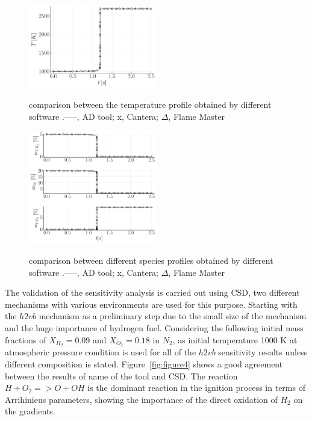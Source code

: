\documentclass[preprint,review,12pt]{elsarticle}
\begin{document}
      \begin{figure}
\centering
 {\includegraphics[width=0.5\textwidth]{figures/T validation.pdf}}
\caption{comparison between the temperature profile obtained by different software .-----, AD tool; x, Cantera; $\Delta$, Flame Master  }
    \label{fig:figure2}
 \end{figure}   
 \begin{figure}
\centering
 {\includegraphics[width=0.5\textwidth]{figures/all validation.pdf}}
\caption{comparison between different species profiles obtained by different software .-----, AD tool; x, Cantera; $\Delta$, Flame Master}
    \label{fig:figure3}
\end{figure}
The validation of the sensitivity analysis is carried out using CSD, two different mechanisms with various environments are used for this purpose. Starting with the $h2vb$ mechanism as a preliminary step due to the small size of the mechanism and the huge importance of hydrogen fuel. Considering the following  initial mass fractions of $X_{H_2} = 0.09$ and $X_{O_2} = 0.18$ in $N_2$, as initial temperature 1000 K at atmospheric pressure condition is used for all of the $h2vb$ sensitivity results unless different composition is stated. Figure~\ref{fig:figure4} shows a good agreement between the results of {\color{red} name of the tool} and CSD.  The reaction  $H+O_2=>O+OH$ is the dominant reaction in the ignition process in terms of Arrihinieus parameters, showing the importance of the direct oxidation of $H_2$ on the gradients.
 
\end{document}
